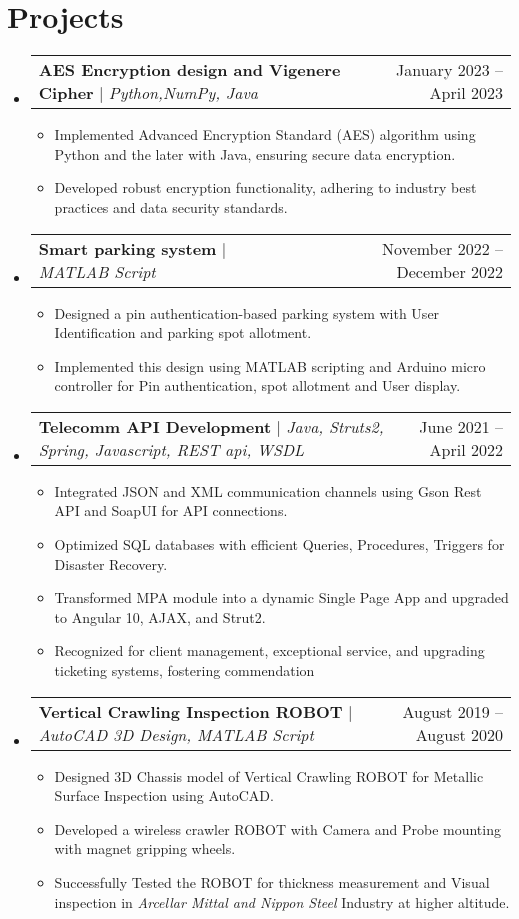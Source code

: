 \documentclass[letterpaper,11pt]{article}
\makeatletter
\newcommand{\resumeItem}[1]{
  \item\small{
    {#1 \vspace{-2pt}}
  }
}
\newcommand{\resumeProjectHeading}[2]{
    \item
    \begin{tabular*}{0.97\textwidth}{l@{\extracolsep{\fill}}r}
      \small#1 & #2 \\
    \end{tabular*}\vspace{-7pt}
}
\newcommand{\resumeSubHeadingListStart}{\begin{itemize}[leftmargin=0.15in, label={}]}
\newcommand{\resumeSubHeadingListEnd}{\end{itemize}}
\newcommand{\resumeItemListStart}{\begin{itemize}}
\newcommand{\resumeItemListEnd}{\end{itemize}\vspace{-5pt}}
\makeatother
\begin{document}
\section{Projects}
    \resumeSubHeadingListStart
      \resumeProjectHeading
          {\textbf{AES Encryption design and Vigenere Cipher} $|$ \emph{Python,NumPy, Java}}{January 2023 -- April 2023}
          \resumeItemListStart
            \resumeItem{Implemented Advanced Encryption Standard (AES) algorithm using Python and the later with Java, ensuring secure data encryption.}
            \resumeItem{Developed robust encryption functionality, adhering to industry best practices and data security standards.}
          \resumeItemListEnd
      \resumeProjectHeading
          {\textbf{Smart parking system} $|$ \emph{MATLAB Script}}{November 2022 -- December 2022}
          \resumeItemListStart
            \resumeItem{Designed a pin authentication-based parking system with User Identification and parking spot allotment.}
            \resumeItem{Implemented this design using MATLAB scripting and Arduino micro controller for Pin authentication, spot allotment and User display.}
          \resumeItemListEnd
       \resumeProjectHeading
          {\textbf{Telecomm API Development} $|$ \emph{ Java, Struts2, Spring, Javascript, REST api, WSDL}}{June 2021 -- April 2022}
          \resumeItemListStart
            \resumeItem{Integrated JSON and XML communication channels using Gson Rest API and SoapUI for API connections.}
            \resumeItem{Optimized SQL databases with efficient Queries, Procedures, Triggers for Disaster Recovery.}
            \resumeItem{Transformed MPA module into a dynamic Single Page App and upgraded to Angular 10, AJAX, and Strut2.}
            \resumeItem{Recognized for client management, exceptional service, and upgrading ticketing systems, fostering commendation}
          \resumeItemListEnd
     \resumeProjectHeading
          {\textbf{Vertical Crawling Inspection ROBOT} $|$ \emph{AutoCAD 3D Design, MATLAB Script}}{August 2019 -- August 2020}
          \resumeItemListStart
            \resumeItem{Designed 3D Chassis model of Vertical Crawling ROBOT for Metallic Surface Inspection using AutoCAD.}
            \resumeItem{Developed a wireless crawler ROBOT with Camera and Probe mounting with magnet gripping wheels.}
            \resumeItem{Successfully Tested the ROBOT for thickness measurement and Visual inspection in  \emph{Arcellar Mittal and Nippon Steel} Industry at higher altitude.}
          \resumeItemListEnd    
    \resumeSubHeadingListEnd



%
\end{document}
